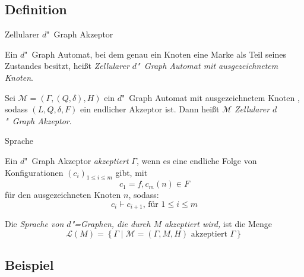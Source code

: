 \documentclass[18pt]{beamer}
\newcommand{\defWord}[1]{\emph{#1}}
\begin{document}
\subsection{Definition}
\begin{frame}{Zellularer $d$"~Graph Akzeptor}
	\begin{definition}
		Ein $d$"~Graph Automat, bei dem genau ein Knoten eine Marke als Teil seines Zustandes  besitzt, heißt \defWord{Zellularer $d$"~Graph Automat mit ausgezeichnetem Knoten}.
	\end{definition}
	\begin{definition}
		Sei $\mathcal{M} = \left(\Gamma, (Q, \delta), H \right)$ ein $d$"~Graph Automat mit ausgezeichnetem Knoten , sodass $(L, Q, \delta, F)$ ein endlicher Akzeptor ist.
		Dann heißt $\mathcal{M}$ \defWord{Zellularer $d$"~Graph Akzeptor}.
	\end{definition}
\end{frame}

\begin{frame}{Sprache}
	\begin{definition}[Akzeptanz]
		Ein $d$"~Graph Akzeptor \defWord{akzeptiert} $\Gamma$, wenn es eine endliche Folge von Konfigurationen $\left(c_i\right)_{1 \le i \le m}$ gibt, mit
		\begin{displaymath}
		c_1 = f, c_m(n) \in F
		\end{displaymath}
		für den ausgezeichneten Knoten $n$, sodass:
		\begin{displaymath}
		c_{i} \vdash c_{i+1} \text{, für } 1 \le i \le m
		\end{displaymath}
	\end{definition}
	\begin{definition}[Sprache]
		Die \defWord{Sprache von $d$"=Graphen, die durch $M$ akzeptiert wird,} ist die Menge 
		\begin{displaymath}
		\mathcal{L}(M) = \left\{\Gamma \mid \mathcal{M} = \left(\Gamma, M, H\right) \text{ akzeptiert } \Gamma \right\}
		\end{displaymath}
	\end{definition}
\end{frame}
\subsection{Beispiel}
\end{document}
